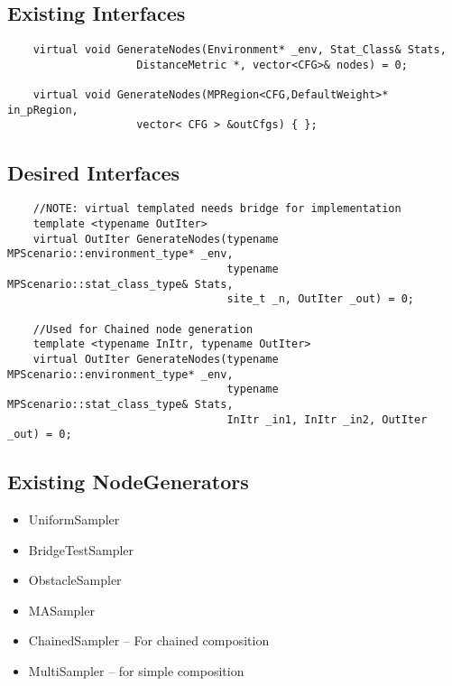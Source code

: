 \subsection{Existing Interfaces}
\begin{lstlisting}
    virtual void GenerateNodes(Environment* _env, Stat_Class& Stats,
		            DistanceMetric *, vector<CFG>& nodes) = 0;
	
	virtual void GenerateNodes(MPRegion<CFG,DefaultWeight>* in_pRegion, 
	                vector< CFG > &outCfgs) { };
\end{lstlisting}
\subsection{Desired Interfaces}
\begin{lstlisting}
    //NOTE: virtual templated needs bridge for implementation
    template <typename OutIter>
    virtual OutIter GenerateNodes(typename MPScenario::environment_type* _env, 
                                  typename MPScenario::stat_class_type& Stats,
                                  site_t _n, OutIter _out) = 0;
                                  
    //Used for Chained node generation
    template <typename InItr, typename OutIter>
    virtual OutIter GenerateNodes(typename MPScenario::environment_type* _env, 
                                  typename MPScenario::stat_class_type& Stats,
                                  InItr _in1, InItr _in2, OutIter _out) = 0;

\end{lstlisting}
\subsection{Existing NodeGenerators}
\begin{itemize}
    \item UniformSampler
    \item BridgeTestSampler
    \item ObstacleSampler
    \item MASampler
    \item ChainedSampler -- For chained composition
    \item MultiSampler -- for simple composition
\end{itemize}


